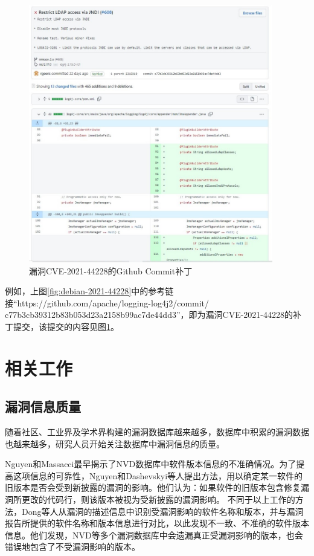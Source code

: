 \begin{figure}[!t]
    \centering
    \includegraphics[width=0.95\textwidth]{fig/commit-2021-44228}
    \caption{漏洞CVE-2021-44228的Github Commit补丁}
    \label{fig:commit-2021-44228}
\end{figure}

例如，上图\ref{fig:debian-2021-44228}中的参考链接“https://github.com/apache/logging-log4j2/commit/\\c77b3cb39312b83b053d23a2158b99ac7de44dd3”，即为漏洞CVE-2021-44228的补丁提交，该提交的内容见图\ref{fig:commit-2021-44228}。


\section{相关工作}
\subsection{漏洞信息质量}
随着社区、工业界及学术界构建的漏洞数据库越来越多，数据库中积累的漏洞数据也越来越多，研究人员开始关注数据库中漏洞信息的质量。

Nguyen和Massacci\cite{nguyen2013reliability}最早揭示了NVD数据库中软件版本信息的不准确情况。为了提高这项信息的可靠性，Nguyen\cite{nguyen2016automatic}和Dashevskyi等人\cite{dashevskyi2018screening}提出方法，用以确定某一软件的旧版本是否会受到新披露的漏洞的影响。他们认为：如果软件的旧版本包含修复漏洞所更改的代码行，则该版本被视为受新披露的漏洞影响。
不同于以上工作的方法，Dong等人\cite{dong2019towards}从漏洞的描述信息中识别受漏洞影响的软件名称和版本，并与漏洞报告所提供的软件名称和版本信息进行对比，以此发现不一致、不准确的软件版本信息。他们发现，NVD等多个漏洞数据库中会遗漏真正受漏洞影响的版本，也会错误地包含了不受漏洞影响的版本。

